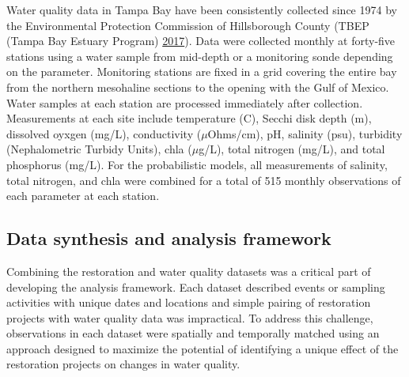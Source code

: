\documentclass[]{article}
\begin{document}
Water quality data in Tampa Bay have been consistently collected since
1974 by the Environmental Protection Commission of Hillsborough County
(TBEP (Tampa Bay Estuary Program) \protect\hyperlink{ref-TBEP17}{2017}).
Data were collected monthly at forty-five stations using a water sample
from mid-depth or a monitoring sonde depending on the parameter.
Monitoring stations are fixed in a grid covering the entire bay from the
northern mesohaline sections to the opening with the Gulf of Mexico.
Water samples at each station are processed immediately after
collection. Measurements at each site include temperature (C), Secchi
disk depth (m), dissolved oyxgen (mg/L), conductivity (\(\mu\)Ohms/cm),
pH, salinity (psu), turbidity (Nephalometric Turbidy Units), \ac{chla}
(\(\mu\)g/L), total nitrogen (mg/L), and total phosphorus (mg/L). For
the probabilistic models, all measurements of salinity, total nitrogen,
and \ac{chla} were combined for a total of 515 monthly observations of
each parameter at each station.

\hypertarget{data-synthesis-and-analysis-framework}{%
\subsection{Data synthesis and analysis
framework}\label{data-synthesis-and-analysis-framework}}

Combining the restoration and water quality datasets was a critical part
of developing the analysis framework. Each dataset described events or
sampling activities with unique dates and locations and simple pairing
of restoration projects with water quality data was impractical. To
address this challenge, observations in each dataset were spatially and
temporally matched using an approach designed to maximize the potential
of identifying a unique effect of the restoration projects on changes in
water quality.
\end{document}
